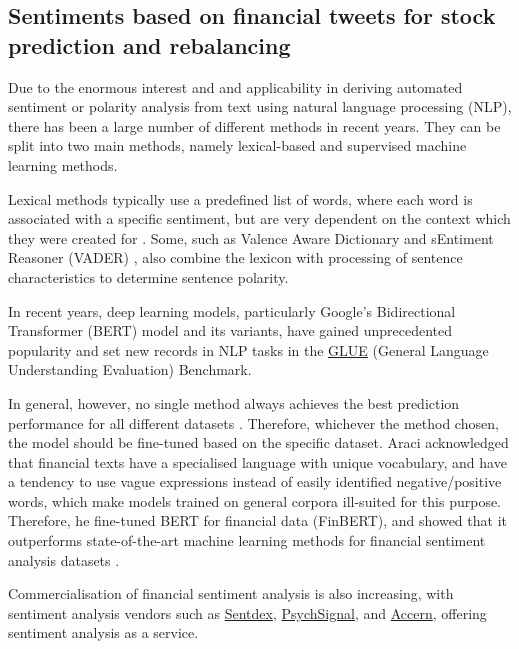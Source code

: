 \documentclass{article}
\begin{document}
\subsection{Sentiments based on financial tweets for stock prediction and rebalancing}

Due to the enormous interest and and applicability in deriving automated sentiment or polarity analysis from text using natural language processing (NLP), there has been a large number of different methods in recent years. They can be split into two main methods, namely lexical-based and supervised machine learning methods.

Lexical methods typically use a predefined list of words, where each word is associated with a specific sentiment, but are very dependent on the context which they were created for \cite{sentibench}. Some, such as Valence Aware Dictionary and sEntiment Reasoner (VADER) \cite{VADER}, also combine the lexicon with processing of sentence characteristics to determine sentence polarity.

In recent years, deep learning models, particularly Google's Bidirectional Transformer (BERT) model \cite{sun2019utilizing,xu2019bert} and its variants, have gained unprecedented popularity and set new records in NLP tasks in the \href{https://gluebenchmark.com/leaderboard}{GLUE} (General Language Understanding Evaluation) Benchmark.

In general, however, no single method always achieves the best prediction performance for all different datasets \cite{sentibench}. Therefore, whichever the method chosen, the model should be fine-tuned based on the specific dataset. Araci \cite{araci2019finbert} acknowledged that financial texts have a specialised language with unique vocabulary, and have a tendency to use vague expressions instead of easily identified negative/positive words, which make models trained on general corpora ill-suited for this purpose. Therefore, he fine-tuned BERT for financial data (FinBERT), and showed that it outperforms state-of-the-art machine learning methods for financial sentiment analysis datasets \cite{araci2019finbert}.

Commercialisation of financial sentiment analysis is also increasing, with sentiment analysis vendors such as \href{http://sentdex.com/financial-analysis/}{Sentdex}, \href{https://psychsignal.com/about}{PsychSignal}, and \href{http://docs.accern.com/#unique-stories-story_id}{Accern}, offering sentiment analysis as a service.
\end{document}
